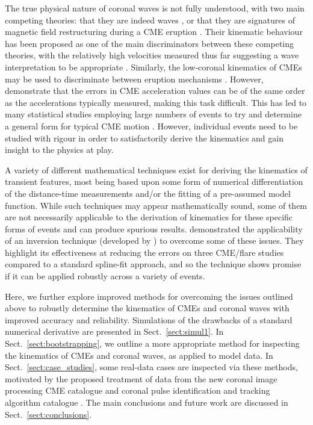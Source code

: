 \documentclass[structabstract]{aa}
\begin{document}
The true physical nature of coronal waves is not fully understood, with two main competing theories: that they are indeed waves \citep[e.g.,][]{2010ApJ...716L..57V, 2012ApJ...754....7S}, or that they are signatures of magnetic field restructuring during a CME eruption \citep[e.g.,][]{2011ApJ...738..167S,2011ApJ...732L..20C}. Their kinematic behaviour has been proposed as one of the main discriminators between these competing theories, with the relatively high velocities measured thus far suggesting a wave interpretation to be appropriate \citep{2011A&A...532A.151W, 2012ApJ...753..112Z}. Similarly, the low-coronal kinematics of CMEs may be used to discriminate between eruption mechanisms \citep[see, for example,][and the CME models discussed therein]{2010A&A...516A..44L}. However, \citet{2007ApJ...657.1117W} demonstrate that the errors in CME acceleration values can be of the same order as the accelerations typically measured, making this task difficult. This has led to many statistical studies employing large numbers of events to try and determine a general form for typical CME motion \citep[e.g.,][]{2000GeoRL..27..145G, 2003AdSpR..32.2637D, 2006ApJ...649.1100Z}. However, individual events need to be studied with rigour in order to satisfactorily derive the kinematics and gain insight to the physics at play.

A variety of different mathematical techniques exist for deriving the kinematics of transient features, most being based upon some form of numerical differentiation of the distance-time measurements and/or the fitting of a pre-assumed model function. While such techniques may appear mathematically sound, some of them are not necessarily applicable to the derivation of kinematics for these specific forms of events and can produce spurious results. \citet{2010ApJ...712.1410T} demonstrated the applicability of an inversion technique (developed by \citealt{2005SoPh..227..299K}) to overcome some of these issues. They highlight its effectiveness at reducing the errors on three CME/flare studies compared to a standard spline-fit approach, and so the technique shows promise if it can be applied robustly across a variety of events.

Here, we further explore improved methods for overcoming the issues outlined above to robustly determine the kinematics of CMEs and coronal waves with improved accuracy and reliability. Simulations of the drawbacks of a standard numerical derivative are presented in Sect.~\ref{sect:simul1}. In Sect.~\ref{sect:bootstrapping}, we outline a more appropriate method for inspecting the  kinematics of CMEs and coronal waves, as applied to model data. In Sect.~\ref{sect:case_studies}, some real-data cases are inspected via these methods, motivated by the proposed treatment of data from the new coronal image processing CME catalogue \citep[CORIMP;][]{2012ApJ...752..144M, 2012ApJ...752..145B} and coronal pulse identification and tracking algorithm catalogue \citep[CorPITA;][]{2011A&A...531A..42L}. The main conclusions and future work are discussed in Sect.~\ref{sect:conclusions}.
\end{document}
